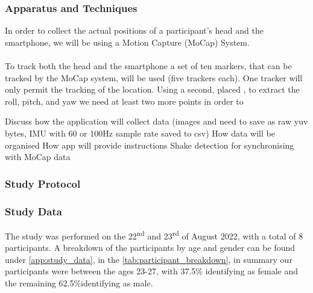 \subsubsection{Apparatus and Techniques}\nl %
In order to collect the actual positions of a participant's head and the smartphone, we will be using a Motion Capture (MoCap) System.
\\\\
To track both the head and the smartphone a set of ten markers, that can be tracked by the MoCap system, will be used (five trackers each).
One tracker will only permit the tracking of the location. Using a second, placed , to extract the roll, pitch, and yaw we need at least two more points in order to 

Discuss how the application will collect data (images and need to save as raw yuv bytes, IMU with 60 or 100Hz sample rate saved to csv)
How data will be organised
How app will provide instructions
Shake detection for synchronising with MoCap data

\subsubsection{Study Protocol}\nl

\subsubsection{Study Data}\nl
The study was performed on the 22\textsuperscript{nd} and 23\textsuperscript{rd} of August 2022, with a total of 8 participants.
A breakdown of the participants by age and gender can be found under \autoref{app:study_data}, in the \autoref{tab:participant_breakdown}, in summary our participants were between the ages 23-27, with 37.5\% identifying as female and the remaining 62.5\%identifying as male.


